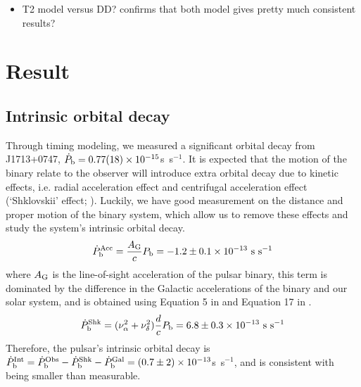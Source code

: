 \begin{itemize}
\item T2 model versus DD? confirms that both model gives pretty much consistent results?
\end{itemize}

\section{Result}

\subsection{Intrinsic orbital decay}
\label{sec:obdecay}
Through timing modeling, we measured a significant orbital decay from
J1713+0747, $\dot{P}_{\rm b} = 0.77(18)\times10^{-15}$s~s$^{-1}$. 
It is expected that the motion of the binary relate to the observer will introduce extra orbital decay due to kinetic effects, i.e. radial acceleration effect \citep{dt91} and centrifugal acceleration effect (`Shklovskii' effect; \citealt{shk70}). Luckily, we have good measurement on the distance and proper motion of the binary system, which allow us to remove these effects 
and study the system's intrinsic orbital decay.
\begin{equation}
\dot{P}_{\rm b}^{\rm Acc} = \frac{A_{\rm G}}{c} P_{\rm b} =
-1.2\pm0.1\times10^{-13}~{\rm s~s^{-1}}
\end{equation}
where $A_{\rm G}$ is the line-of-sight acceleration of the pulsar binary,
this term is dominated by the difference in the Galactic accelerations of the
binary and our solar system, and is obtained using
Equation 5 in \citet{nt95} and Equation 17 in \citet{lwj+09}.
\begin{equation}
\dot{P}_{\rm b}^{\rm Shk} = (\nu_{\alpha}^2+\nu_{\delta}^2)\frac{d}{c}P_{\rm
b} = 6.8\pm0.3\times10^{-13}~{\rm s~s^{-1}}
\end{equation}
Therefore, the pulsar's intrinsic orbital decay is $\dot{P}_{\rm b}^{\rm Int}
= \dot{P}_{\rm b}^{\rm Obs} - \dot{P}_{\rm b}^{\rm Shk} - \dot{P}_{\rm b}^{\rm
Gal} = (0.7\pm2)\times10^{-13}$s~s$^{-1}$, and is consistent with being smaller than measurable.

